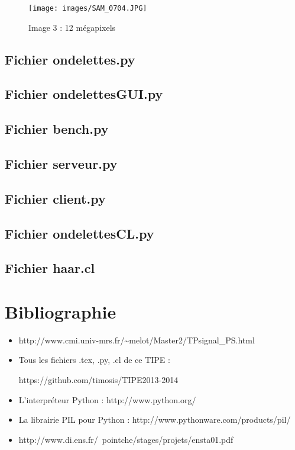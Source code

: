 \documentclass{article}
\begin{document}
\begin{figure}[!h]
\centering
\texttt{[image: images/SAM\_0704.JPG]}
\caption{Image 3 : 12 mégapixels}
\label{12}
\end{figure}

\cleardoublepage

\subsection{Fichier ondelettes.py}


\subsection{Fichier ondelettesGUI.py}


\subsection{Fichier bench.py}


\subsection{Fichier serveur.py}


\subsection{Fichier client.py}


\subsection{Fichier ondelettesCL.py}


\subsection{Fichier haar.cl}


\clearpage

\section{Bibliographie}
\label{links}
\begin{itemize}
\item http://www.cmi.univ-mrs.fr/\textasciitilde{}melot/Master2/TPsignal\_PS.html

\item Tous les fichiers .tex, .py, .cl de ce TIPE :

https://github.com/timosis/TIPE2013-2014

\item L'interpréteur Python : http://www.python.org/

\item La librairie PIL pour Python : http://www.pythonware.com/products/pil/

\item http://www.di.ens.fr/~pointche/stages/projets/ensta01.pdf
\end{itemize}
\end{document}
